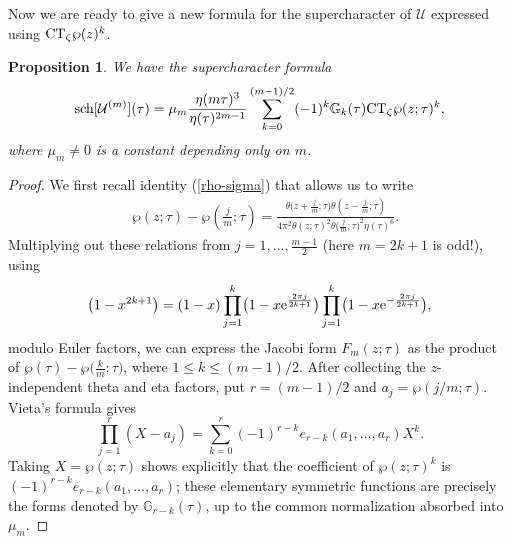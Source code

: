 \documentclass[pdftex]{sigma}
\numberwithin{equation}{section}
\newtheorem{Proposition}[Theorem]{Proposition}
\theoremstyle{definition}
\begin{document}
Now we are ready to give a new formula for the supercharacter of $\mathcal{U}$ expressed using
${\rm CT}_\zeta \wp(z)^k$. \begin{Proposition} \label{jacobi} We have the supercharacter formula
\[
{\rm sch}[\mathcal{U}^{(m)}](\tau)=\mu_m \frac{\eta(m \tau)^3}{\eta(\tau)^{2m-1}} \sum_{k=0}^{(m-1)/2} (-1)^k \mathbb{G}_k(\tau) {\rm CT}_\zeta \wp(z;\tau)^k,
\]
where $\mu_m \neq 0$ is a constant depending only on $m$.
\end{Proposition}
\begin{proof}
We first recall identity (\ref{rho-sigma}) that allows us to write
\begin{align*}
& \wp(z;\tau)-\wp\left(\frac{j}{m};\tau\right)= \frac{\theta\bigl(z+\frac{j}{m};\tau\bigr) \theta(z-\frac{j}{m};\tau)}{ 4 \pi^2 \theta(z;\tau)^2 \theta\bigl(\frac{j}{m};\tau\bigr)^2 \eta(\tau)^6}.
\end{align*}
Multiplying out these relations from $j=1,\dots,\frac{m-1}{2}$ (here $m=2k+1$ is odd!), using
\[
\bigl(1-x^{2k+1}\bigr)=(1-x)\prod_{j=1}^{k}\bigl(1-x {\rm e}^{\frac{2 \pi j }{2k+1}}\bigr)\prod_{j=1}^{k}\bigl(1-x {\rm e}^{-\frac{2 \pi j }{2k+1}}\bigr),
\]
 modulo Euler factors, we can express the Jacobi form $F_m(z;\tau)$ as the product of $\wp(\tau)-\wp\bigl(\frac{k}{m}; \tau\bigr)$, where $1 \leq k \leq (m-1)/2$. After collecting the $z$-independent theta and eta factors, put $r=(m-1)/2$ and $a_j=\wp(j/m;\tau)$. Vieta's formula gives
\[
\prod_{j=1}^{r}(X-a_j)=\sum_{k=0}^{r}(-1)^{r-k}e_{r-k}(a_1,\dots,a_r)X^k.
\]
Taking $X=\wp(z;\tau)$ shows explicitly that the coefficient of $\wp(z;\tau)^k$ is $(-1)^{r-k}e_{r-k}(a_1,\dots,a_r)$; these elementary symmetric functions are precisely the forms denoted by $\mathbb{G}_{r-k}(\tau)$, up to the common normalization absorbed into~$\mu_m$.
\end{proof}
\end{document}
